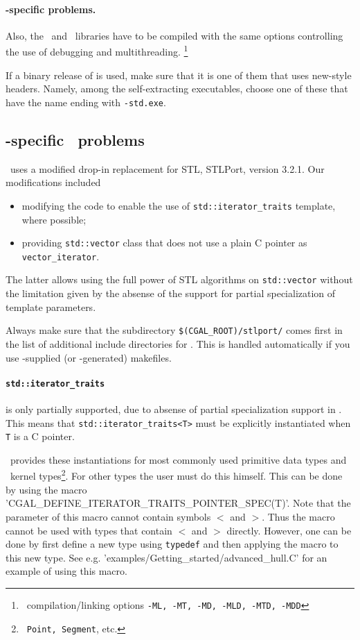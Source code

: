 \paragraph{\msvc-specific problems.}

Also, the \leda\ and \cgal\ libraries have to be compiled with the
same options controlling the use of debugging and multithreading.
\footnote{\msvc\ compilation/linking options \texttt{-ML, -MT, -MD,
    -MLD, -MTD, -MDD}}

If a binary release of \leda{} is used, make sure that it is one of
them that uses new-style headers. Namely, among the self-extracting
executables, choose one of these that have the name ending with
\texttt{-std.exe}.

\subsection{-specific \CC\ problems}

\cgal\ uses a modified drop-in replacement for STL, STLPort, version
3.2.1. Our modifications included
\begin{itemize}
\item modifying the code to enable
the use of \texttt{std::iterator\_traits} template, where possible;
\item providing \texttt{std::vector} class that does not use
a plain C pointer as \texttt{vector\_iterator}.
\end{itemize}
The latter allows using the full power of STL algorithms on
\texttt{std::vector} without the limitation given by the absense
of the support for partial specialization of template parameters.

Always make sure that the subdirectory
\texttt{\$(CGAL\_ROOT)/stlport/} %
comes first in the list of additional include directories for \msvc.
This is handled automatically if you use \cgal-supplied (or \cgal-generated)
makefiles.


\paragraph{\texttt{std::iterator\_traits}} is only partially
supported, due to absense of partial specialization support in \msvc.
This means that \texttt{std::iterator\_traits<T>} must be explicitly
instantiated when \texttt{T} is a C pointer. 

\cgal\ provides
these instantiations for most commonly used primitive data types and
\cgal\ kernel types\footnote{\cgal\ \texttt{Point, Segment}, etc.}.
For other types the user must do this himself.  
This can be done by using the macro
\nonlinkedpath'CGAL_DEFINE_ITERATOR_TRAITS_POINTER_SPEC(T)'.
Note that the parameter of this macro cannot contain symbols $<$ and
$>$. Thus the macro cannot be used with types that contain $<$ and $>$
directly. However, one can be done by first define a new type using 
\texttt{typedef} and then applying the macro to this new type.
See e.g. \nonlinkedpath'examples/Getting_started/advanced_hull.C'
for an example of using this macro.

